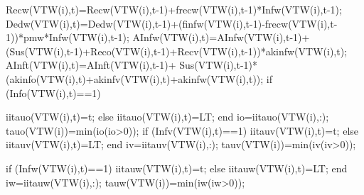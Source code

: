                                           Recw(VTW(i),t)=Recw(VTW(i),t-1)+frecw(VTW(i),t-1)*Infw(VTW(i),t-1);
                                          Dedw(VTW(i),t)=Dedw(VTW(i),t-1)+(finfw(VTW(i),t-1)-frecw(VTW(i),t-1))*pmw*Infw(VTW(i),t-1);
                                          AInfw(VTW(i),t)=AInfw(VTW(i),t-1)+(Sus(VTW(i),t-1)+Reco(VTW(i),t-1)+Recv(VTW(i),t-1))*akinfw(VTW(i),t);                                           
                                          AInft(VTW(i),t)=AInft(VTW(i),t-1)+ Sus(VTW(i),t-1)*(akinfo(VTW(i),t)+akinfv(VTW(i),t)+akinfw(VTW(i),t));
                                          if (Info(VTW(i),t)==1)
                                             
                                              iitauo(VTW(i),t)=t;                                              
                                          else
                                              iitauo(VTW(i),t)=LT;
                                          end
                                          io=iitauo(VTW(i),:);
                                          tauo(VTW(i))=min(io(io>0));
                                          if (Infv(VTW(i),t)==1)                                              
                                              iitauv(VTW(i),t)=t;                                           
                                          else
                                              iitauv(VTW(i),t)=LT;                                             
                                          end
                                          iv=iitauv(VTW(i),:);
                                          tauv(VTW(i))=min(iv(iv>0));
                                          
                                          if (Infw(VTW(i),t)==1)                                              
                                              iitauw(VTW(i),t)=t;                                           
                                          else
                                              iitauw(VTW(i),t)=LT;                                             
                                          end
                                          iw=iitauw(VTW(i),:);
                                          tauw(VTW(i))=min(iw(iw>0));
                                          

